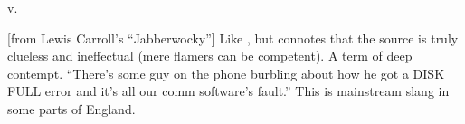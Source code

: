  v.

[from Lewis Carroll's ``Jabberwocky''] Like , but connotes that
the source is truly clueless and ineffectual (mere flamers can be competent). A
term of deep contempt. ``There's some guy on the phone burbling about how he got
a DISK FULL error and it's all our comm software's fault.'' This is mainstream
slang in some parts of England.

